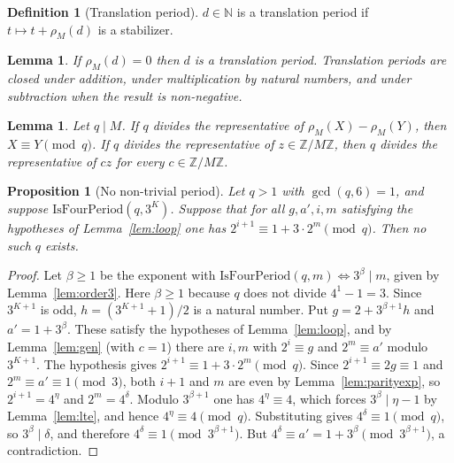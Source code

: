 \documentclass[11pt,reqno,oneside]{amsart}
\theoremstyle{plain}
\newtheorem{proposition}[theorem]{Proposition}
\newtheorem{lemma}[theorem]{Lemma}
\theoremstyle{definition}
\newtheorem{definition}[theorem]{Definition}
\numberwithin{equation}{section}
\begin{document}
\begin{definition}[Translation period]\label{def:tperiod}
$d\in\mathbb N$ is a translation period if $t\mapsto t+\rho_M(d)$ is a stabilizer.
\end{definition}

\begin{lemma}\label{lem:tperiod}
If $\rho_M(d)=0$ then $d$ is a translation period. Translation periods are closed under addition, under multiplication by natural numbers, and under subtraction when the result is non-negative.
\end{lemma}

\begin{lemma}\label{lem:dvdsub}
Let $q\mid M$. If $q$ divides the representative of $\rho_M(X)-\rho_M(Y)$, then $X\equiv Y\pmod q$. If $q$ divides the representative of $z\in\mathbb Z/M\mathbb Z$, then $q$ divides the representative of $cz$ for every $c\in\mathbb Z/M\mathbb Z$.
\end{lemma}

\begin{proposition}[No non-trivial period]\label{prop:periodcontra}
Let $q>1$ with $\gcd(q,6)=1$, and suppose $\mathrm{IsFourPeriod}(q,3^K)$. Suppose that for all $g,a',i,m$ satisfying the hypotheses of Lemma~\ref{lem:loop} one has $2^{i+1}\equiv1+3\cdot2^m\pmod q$. Then no such $q$ exists.
\end{proposition}
\begin{proof}
Let $\beta\ge1$ be the exponent with $\mathrm{IsFourPeriod}(q,m)\iff3^\beta\mid m$, given by Lemma~\ref{lem:order3}. Here $\beta\ge1$ because $q$ does not divide $4^1-1=3$. Since $3^{K+1}$ is odd, $h=(3^{K+1}+1)/2$ is a natural number. Put $g=2+3^{\beta+1}h$ and $a'=1+3^\beta$. These satisfy the hypotheses of Lemma~\ref{lem:loop}, and by Lemma~\ref{lem:gen} (with $c=1$) there are $i,m$ with $2^i\equiv g$ and $2^m\equiv a'$ modulo $3^{K+1}$. The hypothesis gives $2^{i+1}\equiv1+3\cdot2^m\pmod q$. Since $2^{i+1}\equiv2g\equiv1$ and $2^m\equiv a'\equiv1\pmod 3$, both $i+1$ and $m$ are even by Lemma~\ref{lem:parityexp}, so $2^{i+1}=4^{\eta}$ and $2^m=4^\delta$. Modulo $3^{\beta+1}$ one has $4^{\eta}\equiv4$, which forces $3^\beta\mid\eta-1$ by Lemma~\ref{lem:lte}, and hence $4^{\eta}\equiv4\pmod q$. Substituting gives $4^\delta\equiv1\pmod q$, so $3^\beta\mid\delta$, and therefore $4^\delta\equiv1\pmod{3^{\beta+1}}$. But $4^\delta\equiv a'=1+3^\beta\pmod{3^{\beta+1}}$, a contradiction.
\end{proof}
\end{document}
